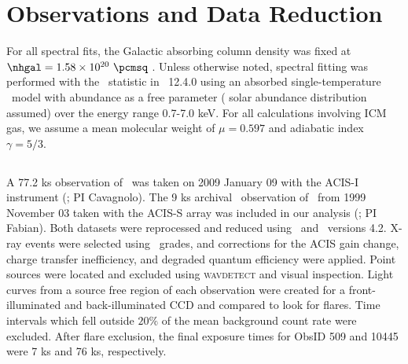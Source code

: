 \documentclass[useAMS,usenatbib]{mn2e}
\begin{document}
\section{Observations and Data Reduction}
\label{sec:obs}

For all spectral fits, the Galactic absorbing column density was fixed
at $\nhgal = 1.58 \times 10^{20} ~\pcmsq$ \citep{lab}. Unless
otherwise noted, spectral fitting was performed with the
\chisq\ statistic in \xspec\ 12.4.0 \citep{xspec} using an absorbed
single-temperature \mekal\ model \citep{mekal1, mekal2} with abundance
as a free parameter (\citealt{ag89} solar abundance distribution
assumed) over the energy range 0.7-7.0 keV.  For all calculations
involving ICM gas, we assume a mean molecular weight of $\mu = 0.597$
and adiabatic index $\gamma = 5/3$.

\subsection{\chandra}
\label{sec:xray}

A 77.2 ks observation of \irs\ was taken on 2009 January 09 with the
ACIS-I instrument (; PI
Cavagnolo). The 9 ks archival \chandra\ observation of \irs\ from 1999
November 03 taken with the ACIS-S array was included in our analysis
(; PI Fabian). Both
datasets were reprocessed and reduced using \ciao\ and
\caldb\ versions 4.2. X-ray events were selected using \asca\ grades,
and corrections for the ACIS gain change, charge transfer
inefficiency, and degraded quantum efficiency were applied. Point
sources were located and excluded using {\textsc{wavdetect}} and
visual inspection. Light curves from a source free region of each
observation were created for a front-illuminated and back-illuminated
CCD and compared to look for flares. Time intervals which fell outside
$20\%$ of the mean background count rate were excluded. After flare
exclusion, the final exposure times for ObsID 509 and 10445 were 7 ks
and 76 ks, respectively.
\end{document}
